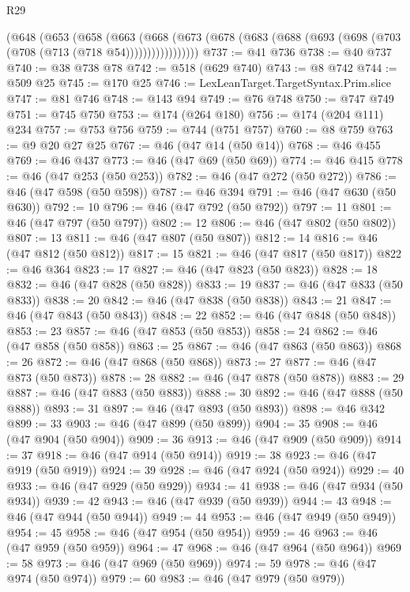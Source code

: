 \begin{lexlean}{R29}
\begin{coremodule}
        (@648
          (@653
            (@658
              (@663
                (@668
                  (@673 (@678 (@683 (@688 (@693 (@698 (@703 (@708 (@713 (@718 @54)))))))))))))))))
@737 := @41 @736
@738 := @40 @737
@740 := @38 @738 @78
@742 := @518 (@629 @740)
@743 := @8 @742
@744 := @509 @25
@745 := @170 @25
@746 := LexLeanTarget.TargetSyntax.Prim.slice
@747 := @81 @746
@748 := @143 @94
@749 := @76 @748
@750 := @747 @749
@751 := @745 @750
@753 := @174 (@264 @180)
@756 := @174 (@204 @111) @234
@757 := @753 @756
@759 := @744 (@751 @757)
@760 := @8 @759
@763 := @9 @20 @27 @25
@767 := @46 (@47 @14 (@50 @14))
@768 := @46 @455
@769 := @46 @437
@773 := @46 (@47 @69 (@50 @69))
@774 := @46 @415
@778 := @46 (@47 @253 (@50 @253))
@782 := @46 (@47 @272 (@50 @272))
@786 := @46 (@47 @598 (@50 @598))
@787 := @46 @394
@791 := @46 (@47 @630 (@50 @630))
@792 := 10
@796 := @46 (@47 @792 (@50 @792))
@797 := 11
@801 := @46 (@47 @797 (@50 @797))
@802 := 12
@806 := @46 (@47 @802 (@50 @802))
@807 := 13
@811 := @46 (@47 @807 (@50 @807))
@812 := 14
@816 := @46 (@47 @812 (@50 @812))
@817 := 15
@821 := @46 (@47 @817 (@50 @817))
@822 := @46 @364
@823 := 17
@827 := @46 (@47 @823 (@50 @823))
@828 := 18
@832 := @46 (@47 @828 (@50 @828))
@833 := 19
@837 := @46 (@47 @833 (@50 @833))
@838 := 20
@842 := @46 (@47 @838 (@50 @838))
@843 := 21
@847 := @46 (@47 @843 (@50 @843))
@848 := 22
@852 := @46 (@47 @848 (@50 @848))
@853 := 23
@857 := @46 (@47 @853 (@50 @853))
@858 := 24
@862 := @46 (@47 @858 (@50 @858))
@863 := 25
@867 := @46 (@47 @863 (@50 @863))
@868 := 26
@872 := @46 (@47 @868 (@50 @868))
@873 := 27
@877 := @46 (@47 @873 (@50 @873))
@878 := 28
@882 := @46 (@47 @878 (@50 @878))
@883 := 29
@887 := @46 (@47 @883 (@50 @883))
@888 := 30
@892 := @46 (@47 @888 (@50 @888))
@893 := 31
@897 := @46 (@47 @893 (@50 @893))
@898 := @46 @342
@899 := 33
@903 := @46 (@47 @899 (@50 @899))
@904 := 35
@908 := @46 (@47 @904 (@50 @904))
@909 := 36
@913 := @46 (@47 @909 (@50 @909))
@914 := 37
@918 := @46 (@47 @914 (@50 @914))
@919 := 38
@923 := @46 (@47 @919 (@50 @919))
@924 := 39
@928 := @46 (@47 @924 (@50 @924))
@929 := 40
@933 := @46 (@47 @929 (@50 @929))
@934 := 41
@938 := @46 (@47 @934 (@50 @934))
@939 := 42
@943 := @46 (@47 @939 (@50 @939))
@944 := 43
@948 := @46 (@47 @944 (@50 @944))
@949 := 44
@953 := @46 (@47 @949 (@50 @949))
@954 := 45
@958 := @46 (@47 @954 (@50 @954))
@959 := 46
@963 := @46 (@47 @959 (@50 @959))
@964 := 47
@968 := @46 (@47 @964 (@50 @964))
@969 := 58
@973 := @46 (@47 @969 (@50 @969))
@974 := 59
@978 := @46 (@47 @974 (@50 @974))
@979 := 60
@983 := @46 (@47 @979 (@50 @979))

\end{coremodule}
\end{lexlean}

